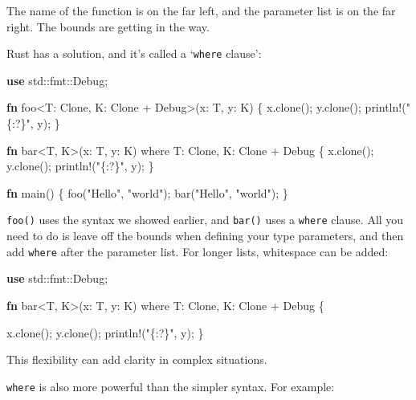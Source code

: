 \documentclass[a4paper,]{book}
\newenvironment{Shaded}{\begin{snugshade}}{\end{snugshade}}
\newcommand{\KeywordTok}[1]{\textcolor[rgb]{0.13,0.29,0.53}{\textbf{{#1}}}}
\newcommand{\StringTok}[1]{\textcolor[rgb]{0.31,0.60,0.02}{{#1}}}
\newcommand{\OtherTok}[1]{\textcolor[rgb]{0.56,0.35,0.01}{{#1}}}
\newcommand{\NormalTok}[1]{{#1}}
\begin{document}
The name of the function is on the far left, and the parameter list is
on the far right. The bounds are getting in the way.

Rust has a solution, and it's called a `\texttt{where} clause':

\begin{Shaded}
\begin{Highlighting}[]
\KeywordTok{use} \NormalTok{std::fmt::Debug;}

\KeywordTok{fn} \NormalTok{foo<T: Clone, K: Clone + Debug>(x: T, y: K) \{}
    \NormalTok{x.clone();}
    \NormalTok{y.clone();}
    \OtherTok{println!}\NormalTok{(}\StringTok{"\{:?\}"}\NormalTok{, y);}
\NormalTok{\}}

\KeywordTok{fn} \NormalTok{bar<T, K>(x: T, y: K) where T: Clone, K: Clone + Debug \{}
    \NormalTok{x.clone();}
    \NormalTok{y.clone();}
    \OtherTok{println!}\NormalTok{(}\StringTok{"\{:?\}"}\NormalTok{, y);}
\NormalTok{\}}

\KeywordTok{fn} \NormalTok{main() \{}
    \NormalTok{foo(}\StringTok{"Hello"}\NormalTok{, }\StringTok{"world"}\NormalTok{);}
    \NormalTok{bar(}\StringTok{"Hello"}\NormalTok{, }\StringTok{"world"}\NormalTok{);}
\NormalTok{\}}
\end{Highlighting}
\end{Shaded}

\texttt{foo()} uses the syntax we showed earlier, and \texttt{bar()}
uses a \texttt{where} clause. All you need to do is leave off the bounds
when defining your type parameters, and then add \texttt{where} after
the parameter list. For longer lists, whitespace can be added:

\begin{Shaded}
\begin{Highlighting}[]
\KeywordTok{use} \NormalTok{std::fmt::Debug;}

\KeywordTok{fn} \NormalTok{bar<T, K>(x: T, y: K)}
    \NormalTok{where T: Clone,}
          \NormalTok{K: Clone + Debug \{}

    \NormalTok{x.clone();}
    \NormalTok{y.clone();}
    \OtherTok{println!}\NormalTok{(}\StringTok{"\{:?\}"}\NormalTok{, y);}
\NormalTok{\}}
\end{Highlighting}
\end{Shaded}

This flexibility can add clarity in complex situations.

\texttt{where} is also more powerful than the simpler syntax. For
example:
\end{document}
